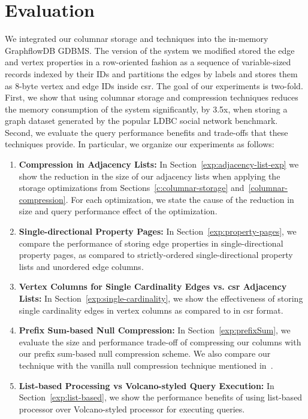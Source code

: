 \chapter{Evaluation}
\label{c:evaluation}

We integrated our columnar storage and techniques into the in-memory GraphflowDB GDBMS. The version of the system we modified stored the edge and vertex properties in a row-oriented fashion as a sequence of variable-sized records indexed by their IDs and partitions the edges by labels and stores them as 8-byte vertex and edge IDs inside \gls{csr}. The goal of our experiments is two-fold. First, we show that using columnar storage and compression techniques reduces the memory consumption of the system significantly, by 3.5x, when storing a graph dataset generated by the popular LDBC social network benchmark. Second, we evaluate the query performance benefits and trade-offs that these techniques provide. In particular, we organize our experiments as follows:

\begin{enumerate}
	\item \textbf{Compression in Adjacency Lists:}  In Section~\ref{exp:adjacency-list-exp} we show the reduction in the size of our adjacency lists when applying the storage optimizations from Sections~\ref{c:columnar-storage} and~\ref{columnar-compression}. For each optimization, we state the cause of the reduction in size and query performance effect of the optimization.
		
	\item \textbf{Single-directional Property Pages:} In Section~\ref{exp:property-pages}, we compare the performance of storing edge properties in single-directional property pages, as compared to strictly-ordered single-directional property lists and unordered edge columns.
	
	\item \textbf{Vertex Columns for Single Cardinality Edges vs. \gls{csr} Adjacency Lists:}  In Section~\ref{exp:single-cardinality}, we show the effectiveness of storing single cardinality edges in vertex  columns as compared to in \gls{csr} format. 
	
	\item \textbf{Prefix Sum-based Null Compression:}  In Section~\ref{exp:prefixSum}, we evaluate the size  and performance trade-off of compressing our columns with our prefix sum-based null compression scheme. We also compare our technique with the vanilla null compression technique mentioned in~\cite{abadi-sparse-col}.%

	\item \textbf{List-based Processing vs Volcano-styled Query Execution:} In Section~\ref{exp:list-based}, we show the performance benefits of using list-based processor over Volcano-styled processor for executing queries.
	
\end{enumerate}

